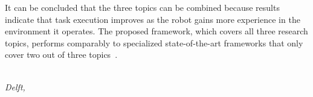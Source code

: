 It can be concluded that the three topics can be combined because results indicate that task execution improves as the robot gains more experience in the environment it operates. The proposed framework, which covers all three research topics, performs comparably to specialized state-of-the-art frameworks that only cover two out of three topics~\cite{ellis_navigation_2022,sabbaghnovin_model_2021,scholz_navigation_2016,vega-brown_asymptotically_2020,wang_affordancebased_2020}.\bs

\begin{flushright}
{\makeatletter\itshape
    \@author\\
    Delft, \monthname{} \the\year{}
\makeatother}
\end{flushright}

